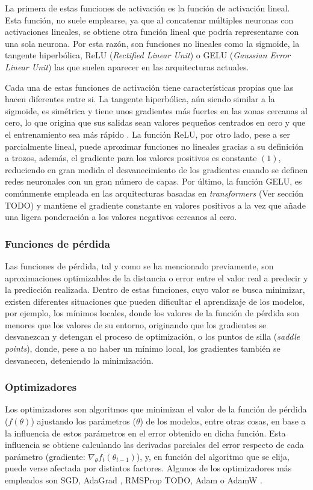 La primera de estas funciones de activación es la función de activación lineal. Esta función, no suele emplearse, ya que al concatenar múltiples neuronas con activaciones lineales, se obtiene otra función lineal que podría representarse con una sola neurona. Por esta razón, son funciones no lineales como la sigmoide, la tangente hiperbólica, ReLU (\textit{Rectified Linear Unit}) \cite{relu} o GELU (\textit{Gaussian Error Linear Unit}) \cite{gelu} las que suelen aparecer en las arquitecturas actuales. 

Cada una de estas funciones de activación tiene características propias que las hacen diferentes entre si. La tangente hiperbólica, aún siendo similar a la sigmoide, es simétrica y tiene unos gradientes más fuertes en las zonas cercanas al cero, lo que origina que sus salidas sean valores pequeños centrados en cero y que el entrenamiento sea más rápido \cite{lecun2012efficient}. La función ReLU, por otro lado, pese a ser parcialmente lineal, puede aproximar funciones no lineales gracias a su definición a trozos, además, el gradiente para los valores positivos es constante $(1)$, reduciendo en gran medida el desvanecimiento de los gradientes cuando se definen redes neuronales con un gran número de capas. Por último, la función GELU, es comúnmente empleada en las arquitecturas basadas en \textit{transformers} (Ver sección TODO) y mantiene el gradiente constante en valores positivos a la vez que añade una ligera ponderación a los valores negativos cercanos al cero.

\subsubsection{Funciones de pérdida}
Las funciones de pérdida, tal y como se ha mencionado previamente, son aproximaciones optimizables de la distancia o error entre el valor real a predecir y la predicción realizada. Dentro de estas funciones, cuyo valor se busca minimizar, existen diferentes situaciones que pueden dificultar el aprendizaje de los modelos, por ejemplo, los mínimos locales, donde los valores de la función de pérdida son menores que los valores de su entorno, originando que los gradientes se desvanezcan y detengan el proceso de optimización, o los puntos de silla (\textit{saddle points}), donde, pese a no haber un mínimo local, los gradientes también se desvanecen, deteniendo la minimización.

\subsubsection{Optimizadores}
Los optimizadores son algoritmos que minimizan el valor de la función de pérdida ($f(\theta)$) ajustando los parámetros ($\theta$) de los modelos, entre otras cosas, en base a la influencia de estos parámetros en el error obtenido en dicha función. Esta influencia se obtiene calculando las derivadas parciales del error respecto de cada parámetro (gradiente: $\nabla_{\theta} f_t(\theta_{t-1})$), y, en función del algoritmo que se elija, puede verse afectada por distintos factores. Algunos de los optimizadores más empleados son SGD, AdaGrad \cite{adagrad}, RMSProp \cite{rmsprop} TODO, Adam \cite{adam} o AdamW \cite{adamw}.


